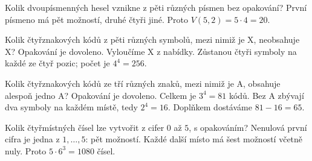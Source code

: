\documentclass[11pt,a4paper]{article}
\begin{document}
\begin{zadaniReseniBox}[title={Úloha C2}]
Kolik dvoupísmenných hesel vznikne z pěti různých písmen bez opakování?
\tcblower
První písmeno má pět možností, druhé čtyři jiné. Proto $V(5,2)=5\cdot4=20$.
\end{zadaniReseniBox}

\begin{zadaniReseniBox}[title={Úloha C3}]
Kolik čtyřznakových kódů z pěti různých symbolů, mezi nimiž je X, neobsahuje X? Opakování je dovoleno.
\tcblower
Vyloučíme X z nabídky. Zůstanou čtyři symboly na každé ze čtyř pozic; počet je $4^4=256$.
\end{zadaniReseniBox}

\begin{zadaniReseniBox}[title={Úloha C4}]
Kolik čtyřznakových kódů ze tří různých znaků, mezi nimiž je A, obsahuje alespoň jedno A? Opakování je dovoleno.
\tcblower
Celkem je $3^4=81$ kódů. Bez A zbývají dva symboly na každém místě, tedy $2^4=16$. Doplňkem dostáváme $81-16=65$.
\end{zadaniReseniBox}

\begin{zadaniReseniBox}[title={Úloha C5}]
Kolik čtyřmístných čísel lze vytvořit z cifer \(0\) až \(5\), s opakováním?
\tcblower
Nenulová první cifra je jedna z $1,\ldots,5$: pět možností. Každé další místo má šest možností včetně nuly. Proto $5\cdot6^3=1080$ čísel.
\end{zadaniReseniBox}


\end{document}
